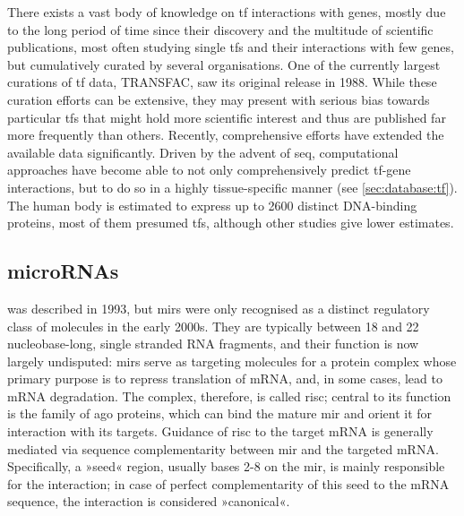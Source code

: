 There exists a vast body of knowledge on \ac{tf} interactions with genes, mostly due to the long period of time since their discovery and the multitude of scientific publications, most often studying single \acp{tf} and their interactions with few genes, but cumulatively curated by several organisations. One of the currently largest curations of \ac{tf} data, TRANSFAC, saw its original release in 1988. While these curation efforts can be extensive, they may present with serious bias towards particular \acp{tf} that might hold more scientific interest and thus are published far more frequently than others. Recently, comprehensive efforts have extended the available data significantly. Driven by the advent of \ac{seq}, computational approaches have become able to not only comprehensively predict \ac{tf}-gene interactions, but to do so in a highly tissue-specific manner (see \ref{sec:database:tf}). The human body is estimated to express up to 2600 distinct DNA-binding proteins, most of them presumed \acp{tf}\cite{Babu2004}, although other studies give lower estimates. 

\subsection{microRNAs} \label{sec:intro:mirna}
 was described in 1993\cite{Lee1993}, but \acp{mir} were only recognised as a distinct regulatory class of molecules in the early 2000s. They are typically between 18 and 22 nucleobase-long, single stranded RNA fragments, and their function is now largely undisputed: \acp{mir} serve as targeting molecules for a protein complex whose primary purpose is to repress translation of mRNA, and, in some cases, lead to mRNA degradation. The complex, therefore, is called \ac{risc}; central to its function is the family of \ac{ago} proteins, which can bind the mature \ac{mir} and orient it for interaction with its targets. Guidance of \ac{risc} to the target mRNA is generally mediated via sequence complementarity between \ac{mir} and the targeted mRNA. Specifically, a »seed« region, usually bases 2-8 on the \ac{mir}, is mainly responsible for the interaction; in case of perfect complementarity of this seed to the mRNA sequence, the interaction is considered »canonical«.


